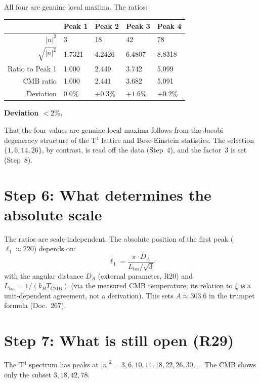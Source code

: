 All four are genuine local maxima. The ratios:

\begin{center}
\begin{tabular}{rllll}
\toprule
 & Peak 1 & Peak 2 & Peak 3 & Peak 4 \\
\midrule
$|n|^2$ & 3 & 18 & 42 & 78 \\
$\sqrt{|n|^2}$ & 1{.}7321 & 4{.}2426 & 6{.}4807 & 8{.}8318 \\
Ratio to Peak 1 & 1{.}000 & 2{.}449 & 3{.}742 & 5{.}099 \\
CMB ratio & 1{.}000 & 2{.}441 & 3{.}682 & 5{.}091 \\
Deviation & 0{.}0\% & $+0{.}3\%$ & $+1{.}6\%$ & $+0{.}2\%$ \\
\bottomrule
\end{tabular}
\end{center}

\textbf{Deviation $< 2\%$.}

That the four values are genuine local maxima follows from the Jacobi
degeneracy structure of the T$^4$ lattice and Bose-Einstein statistics.
The selection $\{1,6,14,26\}$, by contrast, is read off the data (Step~4),
and the factor~3 is set (Step~8).

\section{Step 6: What determines the absolute scale}

The ratios are scale-independent. The absolute position of the
first peak ($\ell_1 \approx 220$) depends on:
\[
  \ell_1 = \frac{\pi \cdot D_A}{L_\mathrm{tor} / \sqrt{3}}
\]
with the angular distance $D_A$ (external parameter, R20) and
$L_\mathrm{tor} = 1/(k_B T_\mathrm{CMB})$ (via the measured CMB
temperature; its relation to $\xi$ is a unit-dependent agreement, not a
derivation).
This sets $A \approx 303{.}6$ in the trumpet formula (Doc.~267).

\section{Step 7: What is still open (R29)}

The T$^4$ spectrum has peaks at $|n|^2 = 3, 6, 10, 14, 18, 22, 26, 30, \ldots$
The CMB shows only the subset $3, 18, 42, 78$.

